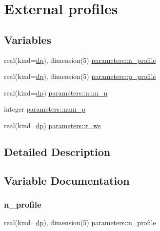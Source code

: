 \hypertarget{group__EXT__PROFILES}{}\section{External profiles}
\label{group__EXT__PROFILES}
\subsection*{Variables}
\begin{DoxyCompactItemize}
\item 
real(kind=\mbox{\hyperlink{namespaceparameters_a52f8c6351fd79345d8811e065bcbbb37}{dp}}), dimension(5) \mbox{\hyperlink{group__EXT__PROFILES_ga212100ee82dc6c5f66b280c3d3c59587}{parameters\+::n\+\_\+profile}}
\item 
real(kind=\mbox{\hyperlink{namespaceparameters_a52f8c6351fd79345d8811e065bcbbb37}{dp}}), dimension(5) \mbox{\hyperlink{group__EXT__PROFILES_gac33314b2e7b3b80461c26fff4b4f6a71}{parameters\+::p\+\_\+profile}}
\item 
real(kind=\mbox{\hyperlink{namespaceparameters_a52f8c6351fd79345d8811e065bcbbb37}{dp}}) \mbox{\hyperlink{group__EXT__PROFILES_ga9fdeb5df8ae40efefdff5ae559099b6e}{parameters\+::num\+\_\+n}}
\item 
integer \mbox{\hyperlink{group__EXT__PROFILES_ga25fb3b9dce82aa8bfe7e1f8e99d66edf}{parameters\+::num\+\_\+p}}
\item 
real(kind=\mbox{\hyperlink{namespaceparameters_a52f8c6351fd79345d8811e065bcbbb37}{dp}}) \mbox{\hyperlink{group__EXT__PROFILES_gadf4b1a873d7f2b95b72c0503f71462c4}{parameters\+::r\+\_\+ws}}
\end{DoxyCompactItemize}


\subsection{Detailed Description}


\subsection{Variable Documentation}
\mbox{\label{group__EXT__PROFILES_ga212100ee82dc6c5f66b280c3d3c59587}} 
\subsubsection{\texorpdfstring{n\+\_\+profile}{n\_profile}}
{\footnotesize\ttfamily real(kind=\mbox{\hyperlink{namespaceparameters_a52f8c6351fd79345d8811e065bcbbb37}{dp}}), dimension(5) parameters\+::n\+\_\+profile}

